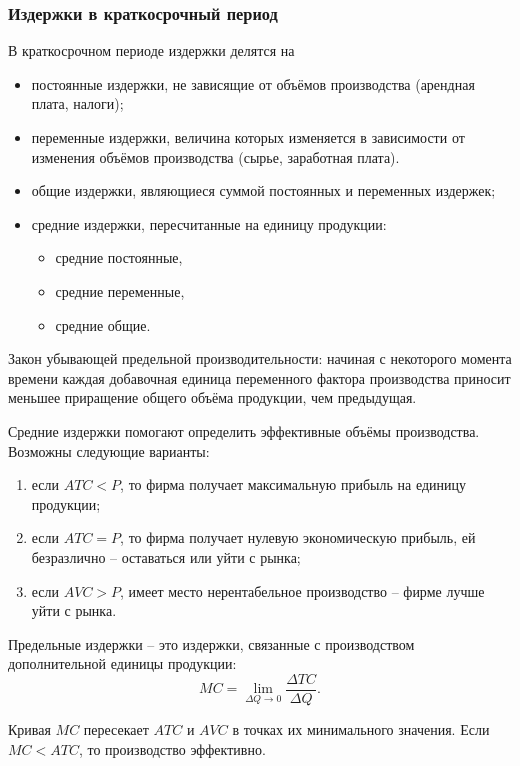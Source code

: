 \subsubsection{Издержки в краткосрочный период}
В краткосрочном периоде издержки делятся на
\begin{itemize}
    \item постоянные издержки, не зависящие от объёмов производства
        (арендная плата, налоги);
    \item переменные издержки, величина которых изменяется в зависимости от
        изменения объёмов производства (сырье, заработная плата).
    \item общие издержки, являющиеся суммой постоянных и переменных издержек;
    \item средние издержки, пересчитанные на единицу продукции:
    \begin{itemize}
        \item средние постоянные,
        \item средние переменные,
        \item средние общие.
    \end{itemize}
\end{itemize}

Закон убывающей предельной производительности: начиная с некоторого момента
времени каждая добавочная единица переменного фактора производства приносит
меньшее приращение общего объёма продукции, чем предыдущая.

Средние издержки помогают определить эффективные объёмы производства. Возможны
следующие варианты:
\begin{enumerate}
    \item если \( ATC < P \), то фирма получает максимальную прибыль на единицу
        продукции;
    \item если \( ATC = P \), то фирма получает нулевую экономическую прибыль,
        ей безразлично -- оставаться или уйти с рынка;
    \item если \( AVC > P \), имеет место нерентабельное производство -- фирме
        лучше уйти с рынка.
\end{enumerate}

Предельные издержки -- это издержки, связанные с производством дополнительной
единицы продукции:
\[
    MC = \lim_{\Delta Q \rightarrow 0} \frac{\Delta TC}{\Delta Q}.
\]

Кривая \( MC \) пересекает \( ATC \) и \( AVC \) в точках их минимального
значения. Если \( MC < ATC \), то производство эффективно.

